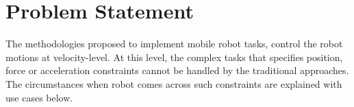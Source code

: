 




\section{Problem Statement} \label{sec:problem}
The methodologies proposed to implement mobile robot tasks, control the robot motions at velocity-level. At this level, the complex tasks that specifies position, force or acceleration constraints cannot be handled by the traditional approaches. The circumstances when robot comes across such constraints are explained with use cases below.

